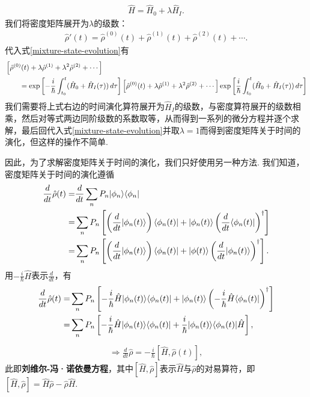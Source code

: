 \documentclass{assignment}
\begin{document}
\begin{itemize}
\begin{itemize}
        \begin{align}
            \hat{H}=\hat{H}_0+\lambda\hat{H}_I.
        \end{align}
        我们将密度矩阵展开为$\lambda$的级数：
        \begin{align}
            \label{density-matrix-expansion}
            \hat{\rho}'(t)=\hat{\rho}^{(0)}(t)+\hat{\rho}^{(1)}(t)+\hat{\rho}^{(2)}(t)+\cdots.
        \end{align}
        代入式\eqref{mixture-state-evolution}有
        \begin{align}
            \notag&\left[\hat{\rho}^{(0)}(t)+\lambda\hat{\rho}^{(1)}+\lambda^2\hat{\rho}^{(2)}+\cdots\right]\\
            &\qquad=\exp\left[-\frac{i}{\hbar}\int_{t_0}^{t}(\hat{H}_0+\hat{H}_I(\tau))\,d\tau\right]\left[\hat{\rho}^{(0)}(t)+\lambda\hat{\rho}^{(1)}+\lambda^2\hat{\rho}^{(2)}+\cdots\right]\exp\left[\frac{i}{\hbar}\int_{t_0}^t(\hat{H}_0+\hat{H}_I(\tau))\,d\tau\right]
        \end{align}
        我们需要将上式右边的时间演化算符展开为$\hat{H}_I$的级数，与密度算符展开的级数相乘，然后对等式两边同阶级数的系数取等，从而得到一系列的微分方程并逐个求解，最后回代入式\eqref{mixture-state-evolution}并取$\lambda=1$而得到密度矩阵关于时间的演化，但这样的操作不简单.
    \end{itemize}
\end{itemize}

因此，为了求解密度矩阵关于时间的演化，我们只好使用另一种方法. 我们知道，密度矩阵关于时间的演化遵循
\begin{align}
    \notag\frac{d}{dt}\hat{\rho}(t)=&\frac{d}{dt}\sum_nP_n\lvert\phi_n\rangle\langle\phi_n\rvert\\
    \notag=&\sum_nP_n\left[\left(\frac{d}{dt}\lvert\phi_n(t)\rangle\right)\langle\phi_n(t)\rvert+\lvert\phi_n(t)\rangle\left(\frac{d}{dt}\langle\phi_n(t)\rvert\right)^{\dagger}\right]\\
    \notag=&\sum_nP_n\left[\left(\frac{d}{dt}\lvert\phi_n(t)\rangle\right)\langle\phi_n(t)\rvert+\lvert\phi(t)\rangle\left(\frac{d}{dt}\lvert\phi_n(t)\rangle\right)^{\dagger}\right].
\end{align}
用$-\frac{i}{\hbar}\hat{H}$表示$\frac{d}{dt}$，有
\begin{align}
    \notag\frac{d}{dt}\hat{\rho}(t)=&\sum_nP_n\left[-\frac{i}{\hbar}\hat{H}\lvert\phi_n(t)\rangle\langle\phi_n(t)\rvert+\lvert\phi_n(t)\rangle\left(-\frac{i}{\hbar}\hat{H}\langle\phi_n(t)\rvert\right)^{\dagger}\right]\\
    \notag=&\sum_nP_n\left[-\frac{i}{\hbar}\hat{H}\lvert\phi_n(t)\rangle\langle\phi_n(t)\rvert+\frac{i}{\hbar}\lvert\phi_n(t)\rangle\langle\phi_n(t)\rvert\hat{H}\right],
\end{align}
\begin{align}
    \label{Liouville-equ}
    \Longrightarrow\boxed{\frac{d}{dt}\hat{\rho}=-\frac{i}{\hbar}[\hat{H},\hat{\rho}(t)]},
\end{align}
此即\textbf{刘维尔-冯·诺依曼方程}，其中$[\hat{H},\hat{\rho}]$表示$\hat{H}$与$\hat{\rho}$的对易算符，即$[\hat{H},\hat{\rho}]=\hat{H}\hat{\rho}-\hat{\rho}\hat{H}$.
\end{document}
